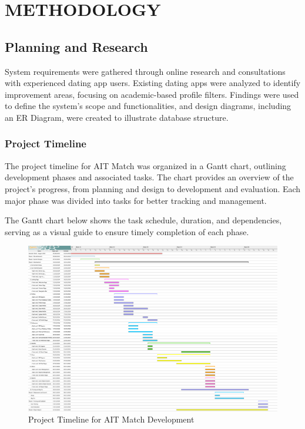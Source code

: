\setlength{\footskip}{8mm}
\chapter{METHODOLOGY}
\section{Planning and Research}
System requirements were gathered through online research and consultations with experienced dating app users. Existing dating apps were analyzed to identify improvement areas, focusing on academic-based profile filters. Findings were used to define the system’s scope and functionalities, and design diagrams, including an ER Diagram, were created to illustrate database structure.

\subsection{Project Timeline}
The project timeline for AIT Match was organized in a Gantt chart, outlining development phases and associated tasks. The chart provides an overview of the project’s progress, from planning and design to development and evaluation. Each major phase was divided into tasks for better tracking and management.

The Gantt chart below shows the task schedule, duration, and dependencies, serving as a visual guide to ensure timely completion of each phase.
    
    \begin{figure}[H]
        \centering
        \captionsetup{justification=centering, singlelinecheck=false, labelsep=space}
        \includegraphics[width=\textwidth]{figures/project-timeline.png} %
        \caption{Project Timeline for AIT Match Development}
        \label{fig:project_timeline}
    \end{figure}
\newpage
